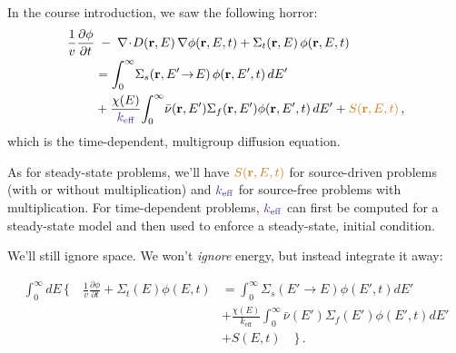 \documentclass[compact]{ne630handout}
\begin{document}


\begin{handoutflow}

 

In the course introduction, we saw the following horror:
\begin{align*}
\frac{1}{v}\frac{\partial \phi}{\partial t}
&\;-\;\nabla \!\cdot\! D(\mathbf r,E)\,\nabla \phi(\mathbf r,E,t)
+\Sigma_t(\mathbf r,E)\,\phi(\mathbf r,E,t) \\
&= \int_0^\infty \!\Sigma_s(\mathbf r,E'\!\to\!E)\,\phi(\mathbf r,E',t)\,dE' \\
&+ \frac{\chi(E)}{\textcolor{wcprimary}{k_{\text{eff}}}}\!\int_0^\infty \!\bar\nu(\mathbf r,E')\Sigma_f(\mathbf r,E')\phi(\mathbf r,E',t)\,dE'
 + \textcolor{wcalerted}{S(\mathbf r,E,t)}\, ,
\end{align*}
which is the time-dependent, multigroup diffusion equation.

\vspace{5pt}

As for steady-state problems, we'll have
$\textcolor{wcalerted}{S(\mathbf r,E,t)}$ for source-driven problems (with or without multiplication) and
$\textcolor{wcprimary}{k_{\text{eff}}}$ for source-free problems with multiplication.  For time-dependent
problems, $\textcolor{wcprimary}{k_{\text{eff}}}$ can first be computed for a steady-state model and then used
to enforce a steady-state, initial condition.




We'll still ignore space. We won't {\it ignore} energy, but instead integrate it away:

\begin{align*}
\int^{\infty}_0 dE \, \Bigg \{ \quad
\frac{1}{v} \frac{\partial \phi}{\partial t}
 + \Sigma_t(E) \phi( E, t) 
  &= \int^{\infty}_0 \Sigma_s(E'\to E) \phi(E', t) dE' \\
  &+ \frac{\chi(E)}{k_{\text{eff}}} \int^{\infty}_0 \bar{\nu}(E')\Sigma_f(E') \phi(E', t) dE'  \\
  &+ S(E, t) \quad \Bigg \} \, .
\end{align*}


\end{handoutflow}
\end{document}
